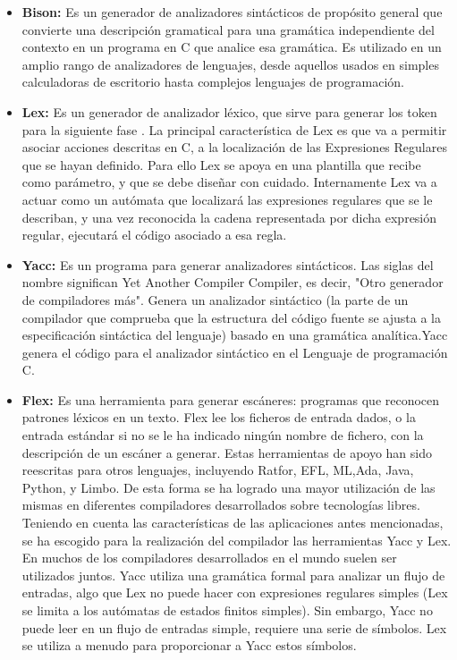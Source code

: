 \documentclass[a4paper,12pt]{article}
\begin{document}
\begin{enumerate}
 \begin{itemize}
  \item \textbf{Bison:} Es un generador de analizadores sintácticos de propósito general que convierte una descripción gramatical para una gramática independiente del contexto en un programa en C que analice esa gramática. Es utilizado en un amplio rango de analizadores de lenguajes, desde aquellos usados en simples calculadoras de escritorio hasta complejos lenguajes de programación.
  \item \textbf{Lex:} Es un generador de analizador léxico, que sirve para generar los token para la siguiente fase . La principal característica de Lex es que va a permitir asociar acciones descritas en C, a la localización de las Expresiones Regulares que se hayan definido. Para ello Lex se apoya en una plantilla que recibe como parámetro, y que se debe diseñar con cuidado. Internamente Lex va a actuar como un autómata que localizará las expresiones regulares que se le describan, y una vez reconocida la cadena representada por dicha expresión regular, ejecutará el código asociado a esa regla.
  \item \textbf{Yacc:} Es un programa para generar analizadores sintácticos. Las siglas del nombre significan Yet Another Compiler Compiler, es decir, "Otro generador de compiladores más". Genera un analizador sintáctico (la parte de un compilador que comprueba que la estructura del código fuente se ajusta a la especificación sintáctica del lenguaje) basado en una gramática analítica.Yacc genera el código para el analizador sintáctico en el Lenguaje de programación C.
  \item \textbf{Flex:} Es una herramienta para generar escáneres: programas que reconocen patrones léxicos en un texto. Flex lee los ficheros de entrada dados, o la entrada estándar si no se le ha indicado ningún nombre de fichero, con la descripción de un escáner a generar. Estas herramientas de apoyo han sido reescritas para otros lenguajes, incluyendo Ratfor, EFL, ML,Ada, Java, Python, y Limbo. De esta forma se ha logrado una mayor utilización de las mismas en diferentes compiladores desarrollados sobre tecnologías libres. Teniendo en cuenta las características de las aplicaciones antes mencionadas, se ha escogido para la realización del compilador las herramientas Yacc y Lex. En muchos de los compiladores desarrollados en el mundo suelen ser utilizados juntos. Yacc utiliza una gramática formal para analizar un flujo de entradas, algo que Lex no puede hacer con expresiones regulares simples (Lex se limita a los autómatas de estados finitos simples). Sin embargo, Yacc no puede leer en un flujo de entradas simple, requiere una serie de símbolos. Lex se utiliza a menudo para proporcionar a Yacc estos símbolos.
 \end{itemize}

 
 
\end{enumerate}
\end{document}
